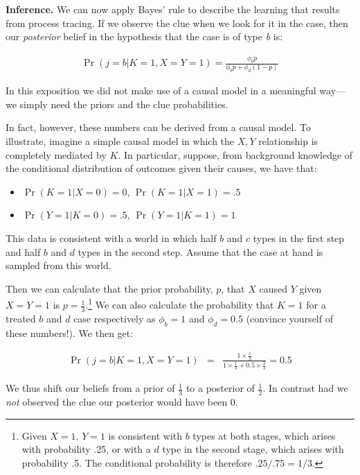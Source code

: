 \documentclass[
  12pt,
]{book}
\providecommand{\tightlist}{%
  \setlength{\itemsep}{0pt}\setlength{\parskip}{0pt}}
\begin{document}
\textbf{Inference.} We can now apply Bayes' rule to describe the learning that results from process tracing. If we observe the clue when we look for it in the case, then our \emph{posterior} belief in the hypothesis that the case is of type \emph{b} is:

\begin{eqnarray*}
\Pr(j = b |K=1, X=Y=1)=  \frac{\phi_b p }{\phi_b p+\phi_d (1-p)}
\end{eqnarray*}

In this exposition we did not make use of a causal model in a meaningful way---we simply need the priors and the clue probabilities.

In fact, however, these numbers can be derived from a causal model. To illustrate, imagine a simple causal model in which the \(X, Y\) relationship is completely mediated by \(K\). In particular, suppose, from background knowledge of the conditional distribution of outcomes given their causes, we have that:

\begin{itemize}
\tightlist
\item
  \(\Pr(K=1 | X=0) = 0\), \(\Pr(K=1 | X=1) = .5\)
\item
  \(\Pr(Y=1 | K=0) = .5\), \(\Pr(Y=1 | K=1) = 1\)
\end{itemize}

This data is consistent with a world in which half \(b\) and \(c\) types in the first step and half \(b\) and \(d\) types in the second step. Assume that the case at hand is sampled from this world.

Then we can calculate that the prior probability, \(p\), that \(X\) caused \(Y\) given \(X=Y=1\) is \(p = \frac13\).\footnote{Given \(X=1\), \(Y=1\) is consistent with \(b\) types at both stages, which arises with probability .25, or with a \(d\) type in the second stage, which arises with probability .5. The conditional probability is therefore \(.25/.75 = 1/3\).} We can also calculate the probability that \(K=1\) for a treated \(b\) and \(d\) case respectively as \(\phi_b=1\) and \(\phi_d=0.5\) (convince yourself of these numbers!). We then get:

\begin{eqnarray*}
\Pr(j = b |K=1, X=Y=1)&=&\frac{1\times \frac13}{1 \times \frac13 + 0.5 \times \frac23}=0.5
\end{eqnarray*}

We thus shift our beliefs from a prior of \(\frac13\) to a posterior of \(\frac12\). In contrast had we \emph{not} observed the clue our posterior would have been 0.
\end{document}
